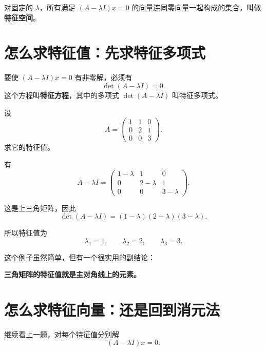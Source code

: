 \documentclass[11pt,oneside,UTF8]{ctexbook}
\newcommand{\important}[1]{\textcolor{Sakura}{\textbf{#1}}}
\begin{document}
对固定的 \(\lambda\)，所有满足 \((A-\lambda I)x=0\) 的向量连同零向量一起构成的集合，叫做\important{特征空间}。

\section{怎么求特征值：先求特征多项式}

要使 \((A-\lambda I)x=0\) 有非零解，必须有
\[
\det(A-\lambda I)=0.
\]
这个方程叫\important{特征方程}，其中的多项式 \(\det(A-\lambda I)\) 叫特征多项式。

\begin{examplebox}[例 6：求三阶矩阵的特征值]
设
\[
A=
\begin{pmatrix}
1&1&0\\
0&2&1\\
0&0&3
\end{pmatrix}.
\]
求它的特征值。

有
\[
A-\lambda I=
\begin{pmatrix}
1-\lambda&1&0\\
0&2-\lambda&1\\
0&0&3-\lambda
\end{pmatrix}.
\]

这是上三角矩阵，因此
\[
\det(A-\lambda I)=(1-\lambda)(2-\lambda)(3-\lambda).
\]

所以特征值为
\[
\lambda_1=1,\qquad \lambda_2=2,\qquad \lambda_3=3.
\]
\end{examplebox}

这个例子虽然简单，但有一个很实用的副结论：
\begin{center}
\important{三角矩阵的特征值就是主对角线上的元素。}
\end{center}

\section{怎么求特征向量：还是回到消元法}

继续看上一题，对每个特征值分别解
\[
(A-\lambda I)x=0.
\]
\end{document}
